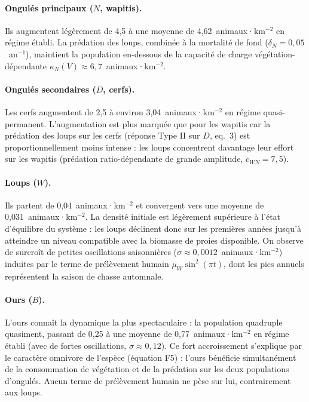 \documentclass[12pt,a4paper]{article}
\begin{document}
\paragraph{Ongulés principaux ($N$, wapitis).} Ils augmentent légèrement de 4,5 à une
moyenne de 4,62~animaux·km$^{-2}$ en régime établi. La prédation des loups, combinée à
la mortalité de fond ($\delta_N = 0{,}05$~an$^{-1}$), maintient la population en-dessous
de la capacité de charge végétation-dépendante $\kappa_N(V) \approx 6{,}7$~animaux·km$^{-2}$.

\paragraph{Ongulés secondaires ($D$, cerfs).} Les cerfs augmentent de 2,5 à environ
3,04~animaux·km$^{-2}$ en régime quasi-permanent. L'augmentation est plus marquée que pour
les wapitis car la prédation des loups sur les cerfs (réponse Type II sur $D$, eq.~3) est
proportionnellement moins intense : les loups concentrent davantage leur effort sur les
wapitis (prédation ratio-dépendante de grande amplitude, $c_{WN} = 7{,}5$).

\paragraph{Loups ($W$).} Ils partent de 0,04~animaux·km$^{-2}$ et convergent vers une
moyenne de 0,031~animaux·km$^{-2}$. La densité initiale est légèrement supérieure à l'état
d'équilibre du système : les loups déclinent donc sur les premières années jusqu'à atteindre
un niveau compatible avec la biomasse de proies disponible. On observe de surcroît de
petites oscillations saisonnières ($\sigma \approx 0{,}0012$~animaux·km$^{-2}$) induites par
le terme de prélèvement humain $\mu_W \sin^2(\pi t)$, dont les pics annuels représentent la
saison de chasse automnale.

\paragraph{Ours ($B$).} L'ours connaît la dynamique la plus spectaculaire : la
population quadruple quasiment, passant de 0,25 à une moyenne de 0,77~animaux·km$^{-2}$
en régime établi (avec de fortes oscillations, $\sigma \approx 0{,}12$). Ce fort accroissement
s'explique par le caractère omnivore de l'espèce (équation F5) : l'ours bénéficie simultanément
de la consommation de végétation et de la prédation sur les deux populations d'ongulés. Aucun
terme de prélèvement humain ne pèse sur lui, contrairement aux loups.
\end{document}
